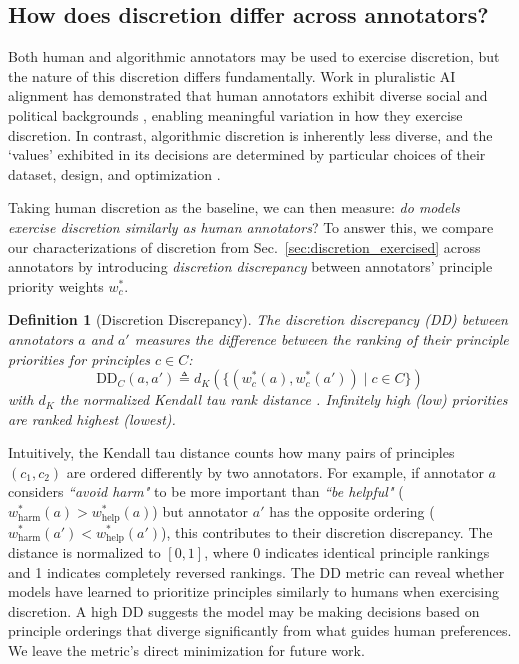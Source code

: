 \documentclass{article}
\newtheorem{definition}{Definition}
\begin{document}
\subsection{How does discretion differ across annotators?}\label{sec:discrepancy}

Both human and algorithmic annotators may be used to exercise discretion, but the nature of this discretion differs fundamentally. Work in pluralistic AI alignment has demonstrated that human annotators exhibit diverse social and political backgrounds \cite{jainAlgorithmicPluralismStructural2024,klassen2024pluralistic,kirkprism}, enabling meaningful variation in how they exercise discretion.
In contrast, algorithmic discretion is inherently less diverse, and the `values' exhibited in its decisions are determined by particular choices of their dataset, design, and optimization \cite{scherrerEvaluatingMoralBeliefs2023a,huang2024trustllm}. 

Taking human discretion as the baseline, we can then measure: \textit{do models exercise discretion similarly as human annotators}? To answer this, we compare our characterizations of discretion from Sec.~\ref{sec:discretion_exercised} across annotators by introducing \textit{discretion discrepancy} 
between annotators' principle priority weights $w^*_c$.
\begin{definition}[Discretion Discrepancy]\label{def:discrepancy}
The \textit{discretion discrepancy} (DD) between annotators $a$ and $a'$ measures the difference between the ranking of their principle priorities for principles $c \in C$:
\begin{equation}
    \text{DD}_C(a, a') \triangleq d_K\left(\{(w^*_c(a),w^*_c(a')) \mid c \in C\}\right)
\end{equation}
with $d_K$ the normalized Kendall tau rank distance \cite{kumar2010generalized}. Infinitely high (low) priorities are ranked highest (lowest).
\end{definition}
Intuitively, the Kendall tau distance counts how many pairs of principles $(c_1,c_2)$ are ordered differently by two annotators. For example, if annotator $a$ considers \textit{``avoid harm"} to be more important than \textit{``be helpful"} ($w^*_{\text{harm}}(a) > w^*_{\text{help}}(a)$) but annotator $a'$ has the opposite ordering ($w^*_{\text{harm}}(a') < w^*_{\text{help}}(a')$), this contributes to their discretion discrepancy. The distance is normalized to $[0,1]$, where 0 indicates identical principle rankings and 1 indicates completely reversed rankings. The DD metric 
can reveal whether models have learned to prioritize principles similarly to humans when exercising discretion. A high DD suggests the model may be making decisions based on principle orderings that diverge significantly from what guides human preferences. We leave the metric's direct minimization for future work.
\end{document}
